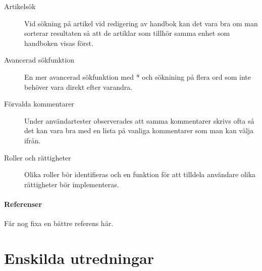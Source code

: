 \documentclass{article}
\begin{document}
\begin{description}
\item[Artikelsök] Vid sökning på artikel vid redigering av handbok kan det vara bra om man sorterar resultaten så att de artiklar som tillhör samma enhet som handboken visas först.
\item[Avancerad sökfunktion] En mer avancerad sökfunktion med * och söknining på flera ord som inte behöver vara direkt efter varandra.
\item[Förvalda kommentarer] Under användartester observerades att samma kommentarer skrivs ofta så det kan vara bra med en lista på vanliga kommentarer som man kan välja ifrån.
\item[Roller och rättigheter] Olika roller bör identifieras och en funktion för att tilldela användare olika rättigheter bör implementeras.
\end{description}
\subsection{Referenser}
\begin{thebibliography}{9}
Får nog fixa en bättre referens här.
\end{thebibliography}

\newpage
\part{Enskilda utredningar}
\renewcommand{\thesection}{\Alph{section}}	

\newpage

\newpage

\newpage

\newpage

\newpage

\newpage

\end{document}
